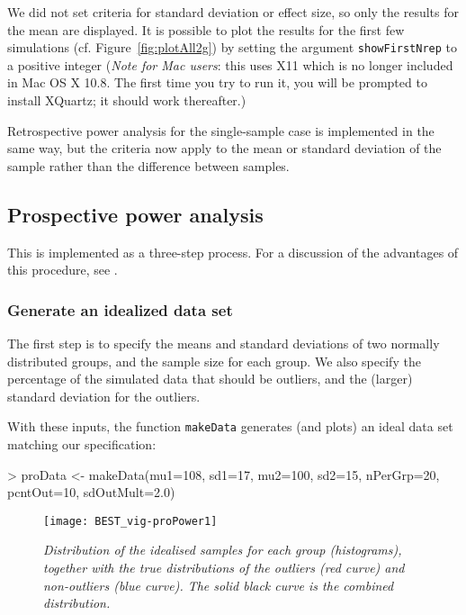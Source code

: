 \documentclass[a4paper]{article}
\begin{document}
We did not set criteria for standard deviation or effect size, so only the results for the mean are displayed. It is possible to plot the results for the first few simulations (cf. Figure~\ref{fig:plotAll2g}) by setting the argument \texttt{showFirstNrep} to a positive integer (\emph{Note for Mac users}: this uses X11 which is no longer included in Mac OS X 10.8. The first time you try to run it, you will be prompted to install XQuartz; it should work thereafter.) 

Retrospective power analysis for the single-sample case is implemented in the same way, but the criteria now apply to the mean or standard deviation of the sample rather than the difference between samples.


\subsection{Prospective power analysis}
\label{subsec:proPower}

This is implemented as a three-step process. For a discussion of the advantages of this procedure, see \citet{kruschke2012BEST}.

\subsubsection{Generate an idealized data set}
\label{subsec:proPower1}

The first step is to specify the means and standard deviations of two normally distributed groups, and the sample size for each group. We also specify the percentage of the simulated data that should be outliers, and the (larger) standard deviation for the outliers.

With these inputs, the function \texttt{makeData} generates (and plots) an ideal data set matching our specification:

\begin{Schunk}
\begin{Sinput}
> proData <- makeData(mu1=108, sd1=17, mu2=100, sd2=15, nPerGrp=20, 
                      pcntOut=10, sdOutMult=2.0)
\end{Sinput}
\end{Schunk}
\begin{figure}[H]
  \centering
  \texttt{[image: BEST\_vig-proPower1]}
  \caption{\it Distribution of the idealised samples for each group (histograms), together with the true distributions of the outliers (red curve) and non-outliers (blue curve). The solid black curve is the combined distribution.}
  \label{fig:proPower1}
\end{figure}
\end{document}
